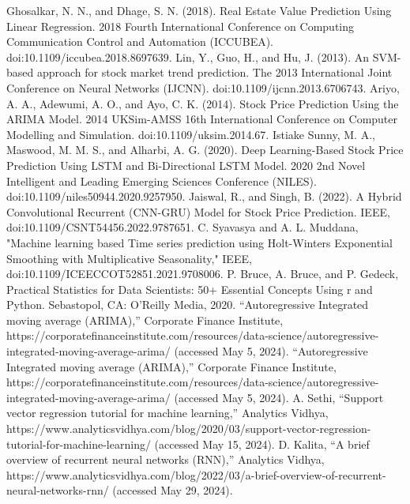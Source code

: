 \documentclass{ieeeojies}
\begin{document}
	
	\begin{thebibliography}{00}
		 Ghosalkar, N. N., and Dhage, S. N. (2018). Real Estate Value Prediction Using Linear Regression. 2018 Fourth International Conference on Computing Communication Control and Automation (ICCUBEA). doi:10.1109/iccubea.2018.8697639.
		 Lin, Y., Guo, H., and Hu, J. (2013). An SVM-based approach for stock market trend prediction. The 2013 International Joint Conference on Neural Networks (IJCNN). doi:10.1109/ijcnn.2013.6706743.
		 Ariyo, A. A., Adewumi, A. O., and Ayo, C. K. (2014). Stock Price Prediction Using the ARIMA Model. 2014 UKSim-AMSS 16th International Conference on Computer Modelling and Simulation. doi:10.1109/uksim.2014.67.
		 Istiake Sunny, M. A., Maswood, M. M. S., and Alharbi, A. G. (2020). Deep Learning-Based Stock Price Prediction Using LSTM and Bi-Directional LSTM Model. 2020 2nd Novel Intelligent and Leading Emerging Sciences Conference (NILES). doi:10.1109/niles50944.2020.9257950.
		 Jaiswal, R., and Singh, B. (2022). A Hybrid Convolutional Recurrent (CNN-GRU) Model for Stock Price Prediction. IEEE, doi:10.1109/CSNT54456.2022.9787651.
		 C. Syavasya and A. L. Muddana, "Machine learning based Time series prediction using Holt-Winters Exponential Smoothing with Multiplicative Seasonality," IEEE, doi:10.1109/ICEECCOT52851.2021.9708006.
		 P. Bruce, A. Bruce, and P. Gedeck, Practical Statistics for Data Scientists: 50+ Essential Concepts Using r and Python. Sebastopol, CA: O’Reilly Media, 2020. 
		 “Autoregressive Integrated moving average (ARIMA),” Corporate Finance Institute, https://corporatefinanceinstitute.com/resources/data-science/autoregressive-integrated-moving-average-arima/ (accessed May 5, 2024). 
		 “Autoregressive Integrated moving average (ARIMA),” Corporate Finance Institute, https://corporatefinanceinstitute.com/resources/data-science/autoregressive-integrated-moving-average-arima/ (accessed May 5, 2024).
		 A. Sethi, “Support vector regression tutorial for machine learning,” Analytics Vidhya, https://www.analyticsvidhya.com/blog/2020/03/support-vector-regression-tutorial-for-machine-learning/ (accessed May 15, 2024). 
		 D. Kalita, “A brief overview of recurrent neural networks (RNN),” Analytics Vidhya, https://www.analyticsvidhya.com/blog/2022/03/a-brief-overview-of-recurrent-neural-networks-rnn/ (accessed May 29, 2024). 

\end{thebibliography}
\end{document}
